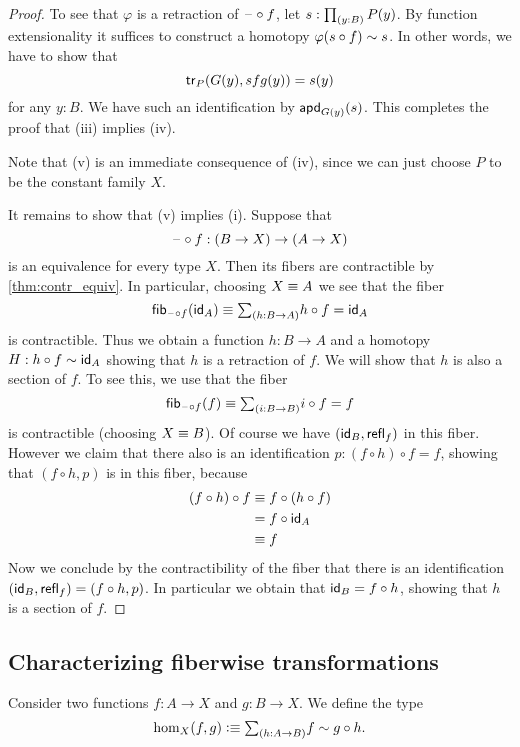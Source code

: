 \begin{proof}
To see that $\varphi$ is a retraction of $\blank\circ f$, let $s:\prd{y:B}P(y)$. By function extensionality it suffices to construct a homotopy $\varphi(s\circ f)\htpy s$. In other words, we have to show that
\begin{equation*}
\tr_P(G(y),sfg(y))=s(y)
\end{equation*}
for any $y:B$. We have such an identification by $\apd{G(y)}{s}$. This completes the proof that (iii) implies (iv).

Note that (v) is an immediate consequence of (iv), since we can just choose $P$ to be the constant family $X$.

It remains to show that (v) implies (i). Suppose that
\begin{equation*}
\blank\circ f:(B\to X)\to (A\to X)
\end{equation*}
is an equivalence for every type $X$. Then its fibers are contractible by \cref{thm:contr_equiv}. In particular, choosing $X\jdeq A$ we see that the fiber
\begin{equation*}
\fib{\blank\circ f}{\idfunc[A]}\jdeq \sm{h:B\to A}h\circ f=\idfunc[A]
\end{equation*}
is contractible. Thus we obtain a function $h:B\to A$ and a homotopy $H:h\circ f\htpy\idfunc[A]$ showing that $h$ is a retraction of $f$. We will show that $h$ is also a section of $f$. To see this, we use that the fiber
\begin{equation*}
\fib{\blank\circ f}{f}\jdeq \sm{i:B\to B} i\circ f=f
\end{equation*}
is contractible (choosing $X\jdeq B$). 
Of course we have $(\idfunc[B],\refl{f})$ in this fiber. However we claim that there also is an identification $p:(f\circ h)\circ f=f$, showing that $(f\circ h,p)$ is in this fiber, because
\begin{align*}
(f\circ h)\circ f & \jdeq f\circ (h\circ f) \\
& = f\circ \idfunc[A] \\
& \jdeq f
\end{align*}
Now we conclude by the contractibility of the fiber that there is an identification $(\idfunc[B],\refl{f})=(f\circ h,p)$. In particular we obtain that $\idfunc[B]=f\circ h$, showing that $h$ is a section of $f$.
\end{proof}

\subsection{Characterizing fiberwise transformations}
\begin{defn}
Consider two functions $f:A\to X$ and $g:B\to X$. We define the type 
\begin{equation*}
\hom_X(f,g)\defeq \sm{h:A\to B} f\htpy g\circ h.
\end{equation*}
\end{defn}

